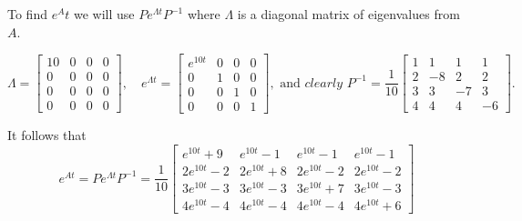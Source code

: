To find $e^At$ we will use $Pe^{\Lambda t}P^{-1}$ where $\Lambda$ is a diagonal matrix of eigenvalues from $A$.

$$\Lambda = \begin{bmatrix}
    10&0&0&0\\ 0&0&0&0\\ 0&0&0&0\\ 0&0&0&0
\end{bmatrix},\quad e^{\Lambda t} = \begin{bmatrix}
    e^{10t}&0&0&0\\ 0&1&0&0\\ 0&0&1&0\\ 0&0&0&1
\end{bmatrix}, \text{ and } \textit{clearly } P^{-1} = \frac{1}{10}\begin{bmatrix}
    1&1&1&1\\
    2&-8&2&2\\
    3&3&-7&3\\
    4&4&4&-6
\end{bmatrix}.$$

It follows that 
$$e^{At} = Pe^{\Lambda t}P^{-1} = \frac{1}{10} \begin{bmatrix}
    e^{10 t} + 9 & e^{10 t} -1 & e^{10 t} -1 & e^{10 t} -1\\
    2e^{10 t} -2 & 2e^{10 t} + 8 & 2e^{10 t} -2 & 2e^{10 t} -2 \\
    3e^{10 t} -3 & 3e^{10 t} -3 & 3e^{10 t} +7 & 3e^{10 t} -3\\
    4e^{10 t} -4 & 4e^{10 t} -4 & 4e^{10 t} -4 & 4e^{10 t} +6
\end{bmatrix}$$